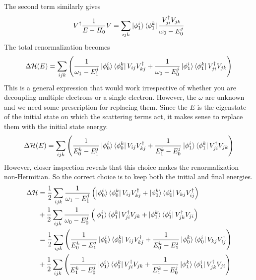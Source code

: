 The second term similarly gives
\begin{equation}\begin{aligned}
V^\dagger\frac{1}{E - H_0}V = \sum_{ijk}\ket{\phi_1^i}\bra{\phi_1^k}\frac{V^\dagger_{ji}V_{jk}}{\omega_0 - E^j_0}
\end{aligned}\end{equation}
The total renormalization becomes
\begin{equation}\begin{aligned}
	\Delta \mathcal{H}(E) = \sum_{ijk}\left(\frac{1}{\omega_1 - E^j_1}\ket{\phi_0^i}\bra{\phi_0^k}V_{ij}V^\dagger_{kj} + \frac{1}{\omega_0 - E^j_0}\ket{\phi_1^i}\bra{\phi_1^k}V^\dagger_{ji}V_{jk}\right)
\end{aligned}\end{equation}
This is a general expression that would work irrespective of whether you are decoupling multiple electrons or a single electron. However, the \(\omega\) are unknown and we need some prescription for replacing them. Since the \(E\) is the eigenstate of the initial state on which the scattering terms act, it makes sense to replace them with the initial state energy.
\begin{equation}\begin{aligned}
	\Delta \mathcal{H}(E) = \sum_{ijk}\left(\frac{1}{E_0^k - E^j_1}\ket{\phi_0^i}\bra{\phi_0^k}V_{ij}V^\dagger_{kj} + \frac{1}{E_1^k - E^j_0}\ket{\phi_1^i}\bra{\phi_1^k}V^\dagger_{ji}V_{jk}\right)
\end{aligned}\end{equation}
However, closer inspection reveals that this choice makes the renormalization non-Hermitian. So the correct choice is to keep both the initial and final energies.
\begin{equation}\begin{aligned}
	\Delta \mathcal{H} &= \frac{1}{2}\sum_{ijk}\frac{1}{\omega_1 - E^j_1}\left(\ket{\phi_0^i}\bra{\phi_0^k}V_{ij}V^\dagger_{kj} + \ket{\phi_0^k}\bra{\phi_0^i}V_{kj}V^\dagger_{ij}\right)\\
			   &+\frac{1}{2}\sum_{ijk}\frac{1}{\omega_0 - E^j_0}\left(\ket{\phi_1^i}\bra{\phi_1^k}V^\dagger_{ji}V_{jk} + \ket{\phi_1^k}\bra{\phi_1^i}V^\dagger_{jk}V_{ji}\right)\\
			   &= \frac{1}{2}\sum_{ijk}\left(\frac{1}{E_0^k - E^j_1}\ket{\phi_0^i}\bra{\phi_0^k}V_{ij}V^\dagger_{kj} + \frac{1}{E_0^k - E^j_1}\ket{\phi_0^k}\bra{\phi_0^i}V_{kj}V^\dagger_{ij}\right)\\
			   &+\frac{1}{2}\sum_{ijk}\left(\frac{1}{E_1^k - E^j_0}\ket{\phi_1^i}\bra{\phi_1^k}V^\dagger_{ji}V_{jk} + \frac{1}{E_1^k - E^j_0}\ket{\phi_1^k}\bra{\phi_1^i}V^\dagger_{jk}V_{ji}\right)
\end{aligned}\end{equation}
